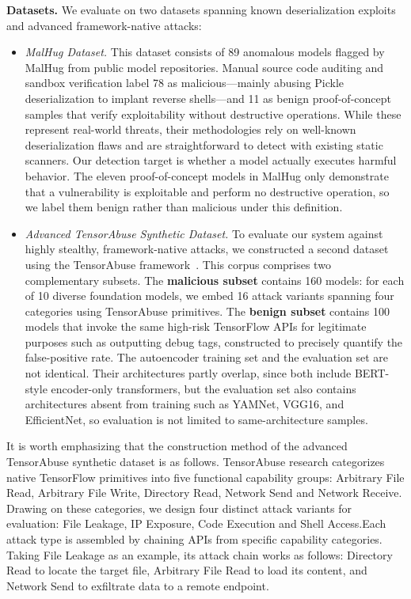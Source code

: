 \noindent \textbf{Datasets.}
We evaluate \toolname{} on two datasets spanning known deserialization exploits and advanced framework-native attacks:
\begin{itemize}
    \item \emph{MalHug Dataset.} This dataset consists of 89 anomalous models flagged by MalHug from public model repositories\cite{malhug}.  Manual source code auditing and sandbox verification label 78 as malicious—mainly abusing Pickle deserialization to implant reverse shells—and 11 as benign proof-of-concept samples that verify exploitability without destructive operations. While these represent real-world threats, their methodologies rely on well-known deserialization flaws and are straightforward to detect with existing static scanners. Our detection target is whether a model actually executes harmful behavior. The eleven proof-of-concept models in MalHug only demonstrate that a vulnerability is exploitable and perform no destructive operation, so we label them benign rather than malicious under this definition.
    \item \emph{Advanced TensorAbuse Synthetic Dataset.} To evaluate our system against highly stealthy, framework-native attacks, we constructed a second dataset using the TensorAbuse framework~\cite{zhu2025}. This corpus comprises two complementary subsets. The \textbf{malicious subset} contains 160 models: for each of 10 diverse foundation models, we embed 16 attack variants spanning four categories using TensorAbuse primitives.  The \textbf{benign subset} contains 100 models that invoke the same high-risk TensorFlow APIs for legitimate purposes such as outputting debug tags, constructed to precisely quantify the false-positive rate. The autoencoder training set and the evaluation set are not identical. Their architectures partly overlap, since both include BERT-style encoder-only transformers, but the evaluation set also contains architectures absent from training such as YAMNet, VGG16, and EfficientNet, so evaluation is not limited to same-architecture samples. 
\end{itemize}

It is worth emphasizing that the construction method of the advanced TensorAbuse synthetic dataset is as follows. TensorAbuse research categorizes native TensorFlow primitives into five functional capability groups: Arbitrary File Read, Arbitrary File Write, Directory Read, Network Send and Network Receive. Drawing on these categories, we design four distinct attack variants for evaluation: File Leakage, IP Exposure, Code Execution and Shell Access.Each attack type is assembled by chaining APIs from specific capability categories. 
Taking File Leakage as an example, its attack chain works as follows:  Directory Read to locate the target file, Arbitrary File Read to load its content, and Network Send to exfiltrate data to a remote endpoint. 

